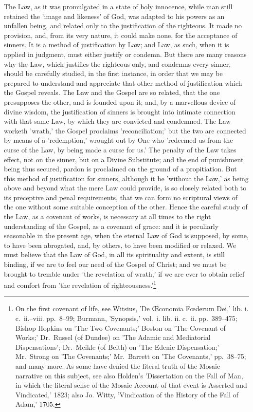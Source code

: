 \documentclass[
]{book}
\begin{document}
The Law, as it was promulgated in a state of holy innocence, while man still retained the 'image and likeness' of God, was adapted to his powers as an unfallen being, and related only to the justification of the righteous. It made no provision, and, from its very nature, it could make none, for the acceptance of sinners. It is a method of justification by Law; and Law, as such, when it is applied in judgment, must either justify or condemn. But there are many reasons why the Law, which justifies the righteous only, and condemns every sinner, should be carefully studied, in the first instance, in order that we may be prepared to understand and appreciate that other method of justification which the Gospel reveals. The Law and the Gospel are so related, that the one presupposes the other, and is founded upon it; and, by a marvellous device of divine wisdom, the justification of sinners is brought into intimate connection with that same Law, by which they are convicted and condemned. The Law worketh 'wrath,' the Gospel proclaims 'reconciliation;' but the two are connected by means of a 'redemption,' wrought out by One who 'redeemed us from the curse of the Law, by being made a curse for us.' The penalty of the Law takes effect, not on the sinner, but on a Divine Substitute; and the end of punishment being thus secured, pardon is proclaimed on the ground of a propitiation. But this method of justification for sinners, although it be 'without the Law,' as being above and beyond what the mere Law could provide, is so closely related both to its preceptive and penal requirements, that we can form no scriptural views of the one without some suitable conception of the other. Hence the careful study of the Law, as a covenant of works, is necessary at all times to the right understanding of the Gospel, as a covenant of grace: and it is peculiarly seasonable in the present age, when the eternal Law of God is supposed, by some, to have been abrogated, and, by others, to have been modified or relaxed. We must believe that the Law of God, in all its spirituality and extent, is still binding, if we are to feel our need of the Gospel of Christ; and we must be brought to tremble under 'the revelation of wrath,' if we are ever to obtain relief and comfort from 'the revelation of righteousness.'\footnote{On the first covenant of life, see Witsius, 'De Œconomia Fœderum Dei,' lib. i. c.~ii.--viii. pp.~8--99; Burmann, 'Synopsis,' vol.~i. lib. ii. c.~ii. pp.~389--475; Bishop Hopkins on 'The Two Covenants;' Boston on 'The Covenant of Works;' Dr.~Russel (of Dundee) on 'The Adamic and Mediatorial Dispensations'; Dr.~Meikle (of Beith) on 'The Edenic Dispensation;' Mr.~Strong on 'The Covenants;' Mr.~Barrett on 'The Covenants,' pp.~38--75; and many more. As some have denied the literal truth of the Mosaic narrative on this subject, see also Holden's 'Dissertation on the Fall of Man, in which the literal sense of the Mosaic Account of that event is Asserted and Vindicated,' 1823; also Jo. Witty, 'Vindication of the History of the Fall of Adam,' 1705.

}
\end{document}
